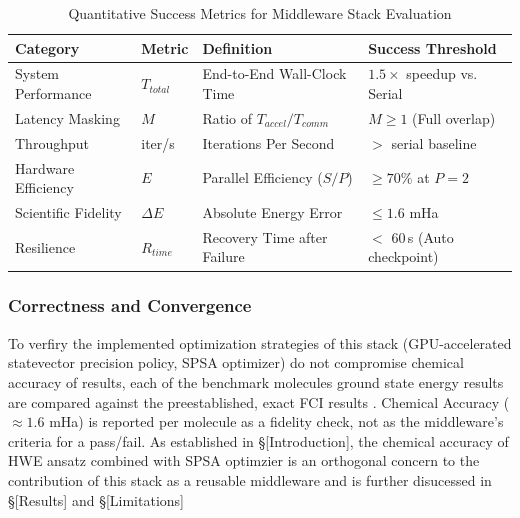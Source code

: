 \begin{table}[htbp]
\centering
\renewcommand{\arraystretch}{1.2}
\small
\begin{tabular}{|>{\raggedright\arraybackslash}p{2.8cm}|>{\raggedright\arraybackslash}p{1.2cm}|>{\raggedright\arraybackslash}p{3.8cm}|>{\raggedright\arraybackslash}p{3.2cm}|}
\hline
\textbf{Category} & \textbf{Metric} & \textbf{Definition} & \textbf{Success Threshold} \\ \hline
System Performance & $T_{total}$ & End-to-End Wall-Clock Time & $1.5\times$ speedup vs. Serial \\ \hline
Latency Masking & $M$ & Ratio of $T_{accel} / T_{comm}$ & $M \geq 1$ (Full overlap) \\ \hline
Throughput & iter/s & Iterations Per Second & $>$ serial baseline \\ \hline
Hardware Efficiency & $E$ & Parallel Efficiency ($S/P$) & $\geq 70\%$ at $P=2$ \\ \hline
Scientific Fidelity & $\Delta E$ & Absolute Energy Error & $\leq 1.6$ mHa \\ \hline
Resilience & $R_{time}$ & Recovery Time after Failure & $<$ 60\,s (Auto checkpoint) \\ \hline
\end{tabular}
\normalsize
\caption{Quantitative Success Metrics for Middleware Stack Evaluation}
\label{table:success_metrics}
\end{table}

\subsubsection{Correctness and Convergence}
To verfiry the implemented optimization strategies of this stack (GPU-accelerated statevector precision policy, SPSA optimizer) do not compromise chemical accuracy of 
results, each of the benchmark molecules ground state energy results are compared against the preestablished, exact
FCI results \parencite{szabo1996modernquantumchemistry}. Chemical Accuracy ($\approx 1.6$ mHa)\parencite{szabo1996modernquantumchemistry} is reported per molecule as a fidelity check, 
not as the middleware's criteria for a pass/fail. As established in \S[Introduction], the chemical accuracy of HWE ansatz combined with SPSA optimzier is 
an orthogonal concern to the contribution of this stack as a reusable middleware and is further disucessed in \S[Results] and \S[Limitations]


